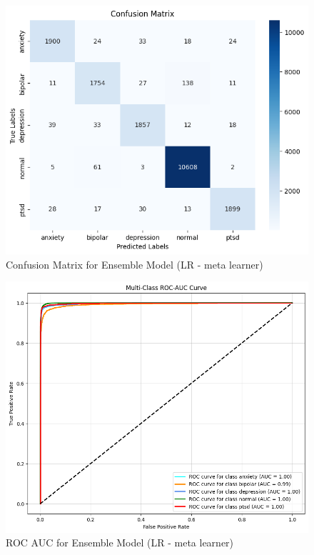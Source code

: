 \begin{figure}[h!]  
    \centering
    \includegraphics[width=1.0\textwidth]{Images/EM FINAL CM.png}  
    \caption{Confusion Matrix for Ensemble Model (LR - meta learner)}
    \label{dfdl1244883}  %
\end{figure}

\begin{figure}[h!]  
    \centering
    \includegraphics[width=1.0\textwidth]{Images/EM FINAL ROC.png}  
    \caption{ROC AUC for Ensemble Model (LR - meta learner)}
    \label{dfdl1244883}  %
\end{figure}

